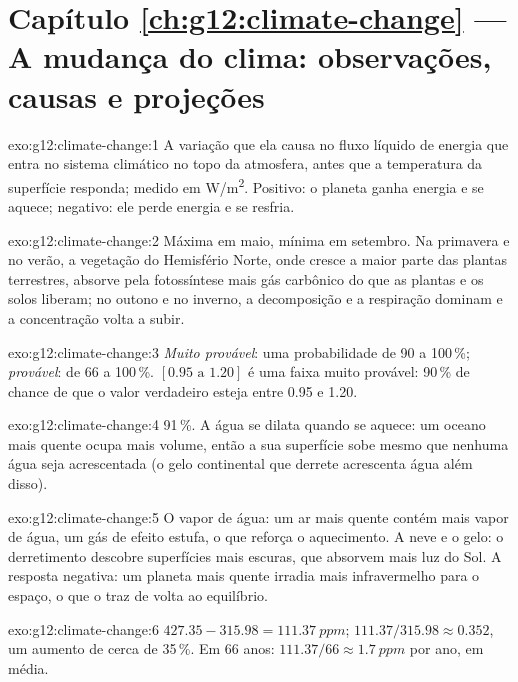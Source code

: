 \section*{Capítulo \ref{ch:g12:climate-change} --- A mudança do clima: observações, causas e projeções}

\begin{solution}{exo:g12:climate-change:1}
A variação que ela causa no fluxo líquido de energia que entra no sistema
climático no topo da atmosfera, antes que a temperatura da superfície
responda; medido em \unit{W/m^2}. Positivo: o planeta ganha energia e se
aquece; negativo: ele perde energia e se resfria.
\end{solution}

\begin{solution}{exo:g12:climate-change:2}
Máxima em maio, mínima em setembro. Na primavera e no verão, a vegetação do
Hemisfério Norte, onde cresce a maior parte das plantas terrestres, absorve
pela fotossíntese mais gás carbônico do que as plantas e os solos liberam;
no outono e no inverno, a decomposição e a respiração dominam e a
concentração volta a subir.
\end{solution}

\begin{solution}{exo:g12:climate-change:3}
\emph{Muito provável}: uma probabilidade de 90 a 100\,\%; \emph{provável}:
de 66 a 100\,\%. $[0.95 \text{ a } 1.20]$ é uma faixa muito provável: 90\,\%
de chance de que o valor verdadeiro esteja entre 0.95 e 1.20.
\end{solution}

\begin{solution}{exo:g12:climate-change:4}
91\,\%. A água se dilata quando se aquece: um oceano mais quente ocupa mais
volume, então a sua superfície sobe mesmo que nenhuma água seja
acrescentada (o gelo continental que derrete acrescenta água além disso).
\end{solution}

\begin{solution}{exo:g12:climate-change:5}
O vapor de água: um ar mais quente contém mais vapor de água, um gás de
efeito estufa, o que reforça o aquecimento. A neve e o gelo: o derretimento
descobre superfícies mais escuras, que absorvem mais luz do Sol. A resposta
negativa: um planeta mais quente irradia mais infravermelho para o espaço,
o que o traz de volta ao equilíbrio.
\end{solution}

\begin{solution}{exo:g12:climate-change:6}
$427.35 - 315.98 = \qty{111.37}{ppm}$; $111.37/315.98 \approx 0.352$, um
aumento de cerca de 35\,\%. Em 66 anos: $111.37/66 \approx
\qty{1.7}{ppm}$ por ano, em média.
\end{solution}

